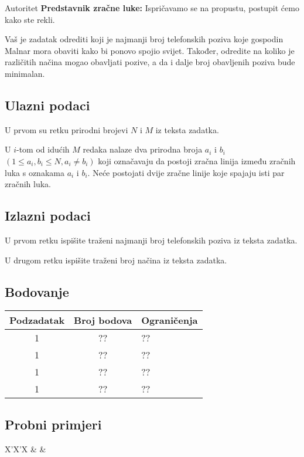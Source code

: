 \begin{statement}[
  problempoints=100,
  timelimit=1 sekunda,
  memorylimit=512 MiB,
]{Autoritet}
\textbf{Predstavnik zračne luke:} Ispričavamo se na propustu, postupit ćemo
  kako ste rekli.

Vaš je zadatak odrediti koji je najmanji broj telefonskih poziva koje gospodin
Malnar mora obaviti kako bi ponovo spojio svijet. Također, odredite na koliko
je različitih načina mogao obavljati pozive, a da i dalje broj obavljenih poziva
bude minimalan.

\subsection*{Ulazni podaci}
U prvom su retku prirodni brojevi $N$ i $M$ iz teksta zadatka.

U $i$-tom od idućih $M$ redaka nalaze dva prirodna broja $a_i$ i $b_i$ $(1 \le
a_i, b_i \le N, a_i \ne b_i)$ koji označavaju da postoji zračna linija između
zračnih luka s oznakama $a_i$ i $b_i$. Neće postojati dvije zračne linije
koje spajaju isti par zračnih luka.

\subsection*{Izlazni podaci}
U prvom retku ispišite traženi najmanji broj telefonskih poziva iz teksta
zadatka.

U drugom retku ispišite traženi broj načina iz teksta zadatka.

\subsection*{Bodovanje}
{\renewcommand{\arraystretch}{1.4}
  \setlength{\tabcolsep}{6pt}
  \begin{tabular}{ccl}
 Podzadatak & Broj bodova & Ograničenja \\ \midrule
  1 & ?? & ?? \\
  1 & ?? & ?? \\
  1 & ?? & ?? \\
  1 & ?? & ?? \\

\end{tabular}}

\subsection*{Probni primjeri}
\begin{tabularx}{\textwidth}{X'X'X}
 &
 &
\end{tabularx}

\end{statement}

